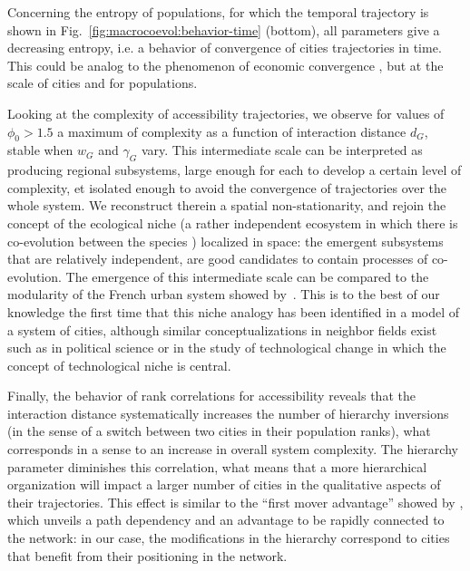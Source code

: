 \documentclass[11pt]{article}
\begin{document}
Concerning the entropy of populations, for which the temporal trajectory is shown in Fig.~\ref{fig:macrocoevol:behavior-time} (bottom), all parameters give a decreasing entropy, i.e. a behavior of convergence of cities trajectories in time. This could be analog to the phenomenon of economic convergence \citep{sachs1995economic}, but at the scale of cities and for populations.



Looking at the complexity of accessibility trajectories, we observe for values of $\phi_0 > 1.5$ a maximum of complexity as a function of interaction distance $d_G$, stable when $w_G$ and $\gamma_G$ vary. This intermediate scale can be interpreted as producing regional subsystems, large enough for each to develop a certain level of complexity, et isolated enough to avoid the convergence of trajectories over the whole system. We reconstruct therein a spatial non-stationarity, and rejoin the concept of the ecological niche (a rather independent ecosystem in which there is co-evolution between the species \citep{holland2012signals}) localized in space: the emergent subsystems that are relatively independent, are good candidates to contain processes of co-evolution. The emergence of this intermediate scale can be compared to the modularity of the French urban system showed by~\cite{berroir2017systemes}. This is to the best of our knowledge the first time that this niche analogy has been identified in a model of a system of cities, although similar conceptualizations in neighbor fields exist such as in political science \citep{monstadt2009conceptualizing} or in the study of technological change \citep{geels2005processes} in which the concept of technological niche is central.



Finally, the behavior of rank correlations for accessibility reveals that the interaction distance systematically increases the number of hierarchy inversions (in the sense of a switch between two cities in their population ranks), what corresponds in a sense to an increase in overall system complexity. The hierarchy parameter diminishes this correlation, what means that a more hierarchical organization will impact a larger number of cities in the qualitative aspects of their trajectories. This effect is similar to the ``first mover advantage'' showed by \cite{levinson2011does}, which unveils a path dependency and an advantage to be rapidly connected to the network: in our case, the modifications in the hierarchy correspond to cities that benefit from their positioning in the network.
\end{document}
